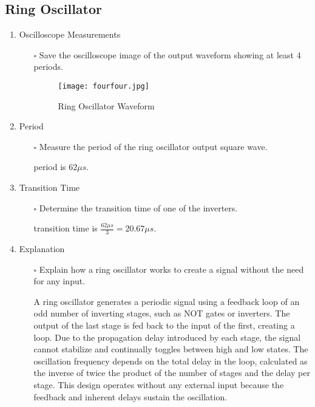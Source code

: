 \documentclass[12pt]{article}
\begin{document}
\subsection{Ring Oscillator}
\begin{enumerate}
\item Oscilloscope Measurements
\begin{itemize}
\item[$\square$] Save the oscilloscope image of the output waveform showing at least 4 periods.

\begin{figure}[h]
    \centering
    \texttt{[image: fourfour.jpg]}
    \caption{Ring Oscillator Waveform}
    \label{fig:Ring-Oscillator-Waveform}
\end{figure}


\end{itemize}
\item Period
\begin{itemize}
\item[$\square$] Measure the period of the ring oscillator output square wave.

period is $62 \mu s$.

\end{itemize}
\item Transition Time
\begin{itemize}
\item[$\square$] Determine the transition time of one of the inverters.

transition time is $\frac{62 \mu s}{3} = 20.67 \mu s$.

\end{itemize}
\item Explanation
\begin{itemize}
\item[$\square$] Explain how a ring oscillator works to create a signal without the need for any input.

A ring oscillator generates a periodic signal using a feedback loop of an odd number of inverting stages, such as NOT gates or inverters. The output of the last stage is fed back to the input of the first, creating a loop. Due to the propagation delay introduced by each stage, the signal cannot stabilize and continually toggles between high and low states. The oscillation frequency depends on the total delay in the loop, calculated as the inverse of twice the product of the number of stages and the delay per stage. This design operates without any external input because the feedback and inherent delays sustain the oscillation.


\end{itemize}
\end{enumerate}
\end{document}
